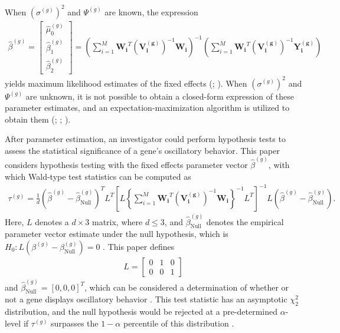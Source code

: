 When $(\sigma^{(g)})^2$ and $\Psi^{(g)}$ are known, the expression
\begin{align*}
    \hat{\beta}^{(g)} = \begin{bmatrix}
    \hat{\mu}^{(g)}_0 \\
    \hat{\beta}^{(g)}_1 \\
    \hat{\beta}^{(g)}_2
    \end{bmatrix} = \left(\sum_{i=1}^M\boldsymbol{W_i}^T(\boldsymbol{V_i^{(g)}})^{-1}\boldsymbol{W_i}\right)^{-1}\left(\sum_{i=1}^M\boldsymbol{W_i}^T(\boldsymbol{V_i^{(g)}})^{-1}\boldsymbol{Y_i^{(g)}}\right)
\end{align*}
yields maximum likelihood estimates of the fixed effects (\citealp[Page 78]{Davidian1995}; \citealp[Equation 6.19]{McCulloch2000}). When $(\sigma^{(g)})^2$ and $\Psi^{(g)}$ are unknown, it is not possible to obtain a closed-form expression of these parameter estimates, and an expectation-maximization algorithm is utilized to obtain them (\citealp[Chapter 4]{Hedeker2006}; \citealp{Laird1987}; \citealp[Chapter 14]{McCulloch2000}).

After parameter estimation, an investigator could perform hypothesis tests to assess the statistical significance of a gene's oscillatory behavior. This paper considers hypothesis testing with the fixed effects parameter vector $\hat{\beta}^{(g)}$, with which Wald-type test statistics can be computed as
\begin{align}
    \tau^{(g)} = \frac{1}{d}(\hat{\beta}^{(g)} - \hat{\beta}^{(g)}_{\text{Null}})^TL^T\left[L\left\{\sum_{i=1}^M\boldsymbol{W_i}^T(\boldsymbol{V_i^{(g)}})^{-1}\boldsymbol{W_i}\right\}^{-1}L^T\right]^{-1}L(\hat{\beta}^{(g)} - \hat{\beta}^{(g)}_{\text{Null}}). \label{eq:wald}
\end{align}
Here, $L$ denotes a $d\times 3$ matrix, where $d\leq 3$, and $\hat{\beta}^{(g)}_{\text{Null}}$ denotes the empirical parameter vector estimate under the null hypothesis, which is $H_0: L(\beta^{(g)} - \beta^{(g)}_{\text{Null}}) = 0$ \citep{Halekoh2014}. This paper defines 
\begin{align*}
    L = \begin{bmatrix}
        0 & 1 & 0 \\
        0 & 0 & 1
    \end{bmatrix}
\end{align*}
and $\hat{\beta}^{(g)}_{\text{Null}} = [0, 0, 0]^T$, which can be considered a determination of whether or not a gene displays oscillatory behavior \citep{Zong2023}. This test statistic has an asymptotic $\chi^2_2$ distribution, and the null hypothesis would be rejected at a pre-determined $\alpha$-level if $\tau^{(g)}$ surpasses the $1-\alpha$ percentile of this distribution \citep{Halekoh2014}. 

